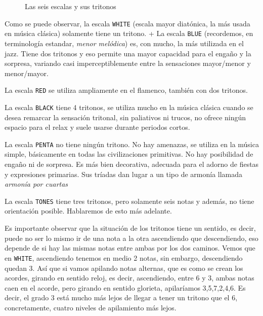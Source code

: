 \documentclass[]{article}
\begin{document}
\begin{figure}
\begin{subfigure}{0.15\textwidth}
    \caption{}
    \label{fig:tikz2}
  \end{subfigure}
  \hfill
  \caption{Las seis escalas y sus tritonos}
  \label{fig:the-six-scales-and-tritones}
\end{figure}


Como se puede observar, la escala \texttt{WHITE} (escala mayor diatónica, la más usada en música clásica) solamente tiene un tritono. + La escala \texttt{BLUE} (recordemos, en terminología estandar, \emph{menor melódica}) es, con mucho, la más utilizada en el jazz. Tiene dos tritonos y eso permite una mayor capacidad para el engaño y la sorpresa, variando casi imperceptiblemente entre la sensaciones mayor/menor y menor/mayor.

La escala \texttt{RED} se utiliza ampliamente en el flamenco, también con dos tritonos.

La escala \texttt{BLACK} tiene 4 tritonos, se utiliza mucho en la música clásica cuando se desea remarcar la sensación tritonal, sin paliativos ni trucos, no ofrece ningún espacio para el relax y suele usarse durante periodos cortos.

La escala \texttt{PENTA} no tiene ningún tritono. No hay amenazas, se utiliza en la música simple, básicamente en todas las civilizaciones primitivas. No hay posibilidad de engaño ni de sorpresa. Es más bien decorativa, adecuada para el adorno de fiestas y expresiones primarias. Sus tríadas dan lugar a un tipo de armonía llamada \emph{armonía por cuartas }

La escala \texttt{TONES} tiene tres tritonos, pero solamente seis notas y además, no tiene orientación posible. Hablaremos de esto más adelante.

Es importante observar que la situación de los tritonos tiene un sentido, es decir, puede no ser lo mismo ir de una nota a la otra ascendiendo que descendiendo, eso depende de si hay las mismas notas entre ambas por los dos caminos. Vemos que en \texttt{WHITE}, ascendiendo tenemos en medio 2 notas, sin embargo, descendiendo quedan 3. Así que si vamos apilando notas alternas, que es como se crean los acordes, girando en sentido reloj, es decir, ascendiendo, entre 6 y 3, ambas notas caen en el acorde, pero girando en sentido glorieta, apilaríamos 3,5,7,2,4,6. Es decir, el grado 3 está mucho más lejos de llegar a tener un tritono que el 6, concretamente, cuatro niveles de apilamiento más lejos.
\end{document}
